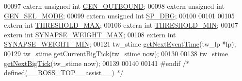 \begin{DoxyCode}
00097 \textcolor{keyword}{extern} \textcolor{keywordtype}{unsigned} \textcolor{keywordtype}{int} \hyperlink{assist_8h_a6f8efb1b6d497ba57f27acadae57dc4b}{GEN\_OUTBOUND};
00098 \textcolor{keyword}{extern} \textcolor{keywordtype}{unsigned} \textcolor{keywordtype}{int} \hyperlink{assist_8h_ab161ae8a99d41559eba4ab3dd8d69218}{GEN\_SEL\_MODE};
00099 \textcolor{keyword}{extern} \textcolor{keywordtype}{unsigned} \textcolor{keywordtype}{int} \hyperlink{assist_8h_a0a9f8592bd29be6c5c7433c3c0bf42dd}{SP\_DBG};
00100 
00101 
00105 \textcolor{keyword}{extern} \textcolor{keywordtype}{int} \hyperlink{assist_8h_a433873baf41da436ba9c1734c8c5ddd2}{THRESHOLD\_MAX};
00106 \textcolor{keyword}{extern} \textcolor{keywordtype}{int} \hyperlink{assist_8h_a55f4484944f4174b5e677c0a71b30e4a}{THRESHOLD\_MIN};
00107 \textcolor{keyword}{extern} \textcolor{keywordtype}{int} \hyperlink{assist_8h_a20ef6d41d2f384358522fb59fb6226cb}{SYNAPSE\_WEIGHT\_MAX};
00108 \textcolor{keyword}{extern} \textcolor{keywordtype}{int} \hyperlink{assist_8h_af38a0e2e2483ef81f7ea5175c366ce82}{SYNAPSE\_WEIGHT\_MIN};
00121 tw\_stime \hyperlink{assist_8h_a30602b11dbfa6bcb90dc00e7942cfb02}{getNextEventTime}(tw\_lp *lp);
00129 tw\_stime \hyperlink{assist_8h_a4d378196b7fceed090d64ec8820b4065}{getCurrentBigTick}(tw\_stime now);
00130 
00138 tw\_stime \hyperlink{assist_8h_aa961bc9b414f1429b123fc8212c989fd}{getNextBigTick}(tw\_stime now);
00139 
00140 
00141 \textcolor{preprocessor}{#endif }\textcolor{comment}{/* defined(\_\_ROSS\_TOP\_\_assist\_\_) */}\textcolor{preprocessor}{}
\end{DoxyCode}
